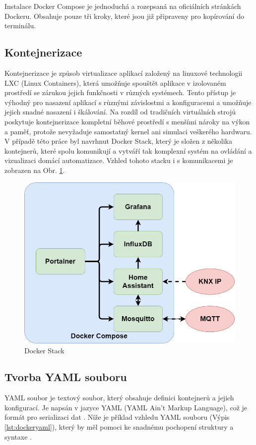 Instalace Docker Compose je jednoduchá a rozepsaná na oficiálních stránkách Dockeru. Obsahuje pouze tři kroky, které jsou již připraveny pro kopírování do terminálu. \cite{DockerInstallationForDebian}

\subsection{Kontejnerizace}
Kontejnerizace je způsob virtualizace aplikací založený na linuxové technologii LXC (Linux Containers), která umožňuje spouštět aplikace v izolovaném prostředí se zárukou jejich funkčnosti v různých systémech. Tento přístup je výhodný pro nasazení aplikací s různými závislostmi a konfiguracemi a umožňuje jejich snadné nasazení i škálování. Na rozdíl od tradičních virtuálních strojů poskytuje kontejnerizace kompletní běhové prostředí s menšími nároky na výkon a paměť, protože nevyžaduje samostatný kernel ani simulaci veškerého hardwaru. \cite{ContainerAndVirtualization}
V případě této práce byl navrhnut Docker Stack, který je složen z několika kontejnerů, které spolu komunikují a vytváří tak komplexní systém na ovládání a vizualizaci domácí automatizace. Vzhled tohoto stacku i s komunikacemi je zobrazen na Obr. \ref{fig:DockerStack}.
\begin{figure}[!ht]
    \begin{center}
        \includegraphics[scale=0.30]{obrazky/stack.png}
    \end{center}
    \caption[Docker Stack]{Docker Stack }
    \label{fig:DockerStack}
\end{figure}
\subsection{Tvorba YAML souboru}
YAML soubor je textový soubor, který obsahuje definici kontejnerů a jejich konfigurací. Je napsán v jazyce YAML (YAML Ain't Markup Language), což je formát pro serializaci dat \cite{YAML}. Níže je příklad vzhledu YAML souboru (Výpis \ref{lst:dockeryaml}), který by měl pomoci ke snadnému pochopení struktury a syntaxe \cite{ComposeYamlExample}.

